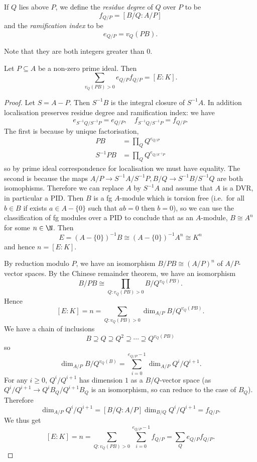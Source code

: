 \documentclass[a4paper]{article}
\begin{document}
\begin{definition}
  If \(Q\) lies above \(P\), we define the \emph{residue degree} of \(Q\) over \(P\) to be
  \[
    f_{Q/P} = [B/Q: A/P]
  \]
  and the \emph{ramification index} to be
  \[
    e_{Q/P} = v_Q(PB).
  \]
\end{definition}
Note that they are both integers greater than \(0\).

\begin{proposition}
  Let \(P \subseteq A\) be a non-zero prime ideal. Then
  \[
    \sum_{v_Q(PB) > 0} e_{Q/P} f_{Q/P} = [E : K].
  \]
\end{proposition}

\begin{proof}
  Let \(S = A - P\). Then \(S^{-1}B\) is the integral closure of \(S^{-1}A\). In addition localisation preserves residue degree and ramification index: we have
  \[
    e_{S^{-1}Q/S^{-1}P} = e_{Q/P}, \quad f_{S^{-1}Q/S^{-1}P} = f_{Q/P}.
  \]
  The first is because by unique factorisation,
  \begin{align*}
    PB &= \prod_Q Q^{e_{Q/P}} \\
    S^{-1}PB &= \prod_{Q} Q^{e_{Q/S^{-1}P}}
  \end{align*}
  so by prime ideal correspondence for localisation we must have equality. The second is because the maps \(A/P \to S^{-1}A/S^{-1}P, B/Q \to S^{-1}B/S^{-1}Q\) are both isomophisms. Therefore we can replace \(A\) by \(S^{-1}A\) and assume that \(A\) is a DVR, in particular a PID. Then \(B\) is a fg \(A\)-module which is torsion free (i.e.\ for all \(b \in B\) if exists \(a \in A - \{0\}\) such that \(ab = 0\) then \(b = 0\)), so we can use the classification of fg modules over a PID to conclude that as an \(A\)-module, \(B \cong A^n\) for some \(n \in \N\). Then
  \[
    E = (A - \{0\})^{-1}B \cong (A - \{0\})^{-1}A^n \cong K^n
  \]
  and hence \(n = [E : K]\).

  By reduction modulo \(P\), we have an isomorphism \(B/PB \cong (A/P)^n\) of \(A/P\)-vector spaces. By the Chinese remainder theorem, we have an isomorphism
  \[
    B/PB \cong \prod_{Q: v_Q(PB) > 0} B/Q^{v_Q(PB)}.
  \]
  Hence
  \[
    [E : K] = n = \sum_{Q: v_Q(PB) > 0} \dim_{A/P} B/Q^{v_Q(PB)}.
  \]
  We have a chain of inclusions
  \[
    B \supseteq Q \supseteq Q^2 \supseteq \cdots \supseteq Q^{v_Q(PB)}
  \]
  so
  \[
    \dim_{A/P} B/Q^{v_Q(B)} = \sum_{i = 0}^{e_{Q/P} - 1} \dim_{A/P} Q^i/Q^{i + 1}.
  \]
  For any \(i \geq 0\), \(Q^i/Q^{i + 1}\) has dimension \(1\) as a \(B/Q\)-vector space (as \(Q^i/Q^{i + 1} \to Q^iB_Q/Q^{i + 1}B_Q\) is an isomorphism, so can reduce to the case of \(B_Q\)). Therefore
  \[
    \dim_{A/P} Q^i/Q^{i + 1} = [B/Q : A/P] \dim_{B/Q} Q^i/Q^{i + 1} = f_{Q/P}.
  \]
  We thus get
  \[
    [E : K] = n = \sum_{Q: v_Q(PB) > 0} \sum_{i = 0}^{e_{Q/P} - 1} f_{Q/P} = \sum_Q e_{Q/P} f_{Q/P}.
  \]
\end{proof}
\end{document}
